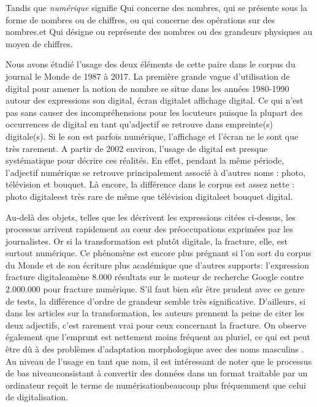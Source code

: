 Tandis que \textit{numérique} signifie \og Qui concerne des nombres, qui se présente sous la forme de nombres ou de chiffres, ou qui concerne des opérations sur des nombres.\fg  et \og Qui désigne ou représente des nombres ou des grandeurs physiques au moyen de chiffres\fg .%

 Nous avons étudié l'usage des deux éléments de cette paire dans le corpus du journal le Monde de 1987 à 2017.
 La première grande vague d'utilisation de digital pour amener la notion de nombre se situe dans les années 1980-1990 autour des expressions \og son digital\fg , \og écran digital\fg  et affichage digital. Ce qui n'est pas sans causer des incompréhensions pour les locuteurs puisque la plupart des occurrences de digital en tant qu'adjectif se retrouve dans \og empreinte(s) digitale(s)\fg .
 Si le son est parfois \og numérique\fg , l'affichage et l'écran ne le sont que très rarement. A partir de 2002 environ, l'usage de digital est presque systématique pour décrire ces réalités.
 En effet, pendant la même période, l'adjectif numérique se retrouve principalement associé à d'autres noms : photo, télévision et bouquet.
Là encore, la différence dans le corpus est assez nette : \og photo digitale\fg  est très rare de même que \og télévision digitale\fg  et \og bouquet digital\fg .
 
 Au-delà des objets, telles que les décrivent les expressions citées ci-dessus, les processus arrivent rapidement au cœur des préoccupations exprimées par les journalistes. Or si la transformation est plutôt digitale, la fracture, elle, est surtout numérique. Ce phénomène est encore plus prégnant si l'on sort du corpus du Monde et de son écriture plus académique que d'autres supports: l'expression \og fracture digitale\fg  amène 8.000 résultats sur le moteur de recherche Google contre 2.000.000 pour \og fracture numérique\fg . S'il faut bien sûr être prudent avec ce genre de tests, la différence d'ordre de grandeur semble très significative. D'ailleurs, si dans les articles sur la \og transformation\fg , les auteurs prennent la peine de citer les deux adjectifs, c'est rarement vrai pour ceux concernant la \og fracture\fg .
On observe également que l'emprunt est nettement moins fréquent au pluriel, ce qui est peut être dû à des problèmes d'adaptation morphologique avec des noms masculins \cite{Anas-2011}.
Au niveau de l'usage en tant que nom, il est intéressant de noter que le processus de \og bas niveau\fg  consistant à convertir des données dans un format traitable par un ordinateur reçoit le terme de \og numérisation\fg  beaucoup plus fréquemment que celui de \og digitalisation\fg .

